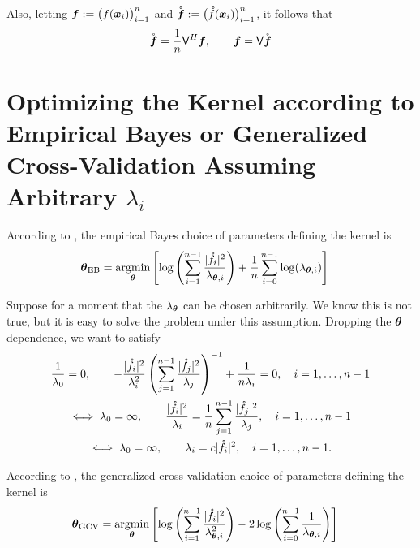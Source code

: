 \documentclass{amsart}
\newcommand{\rvf}{\mathring{\vf}}
\begin{document}
Also, letting $\boldsymbol{f} := \bigl( f(\boldsymbol{x}_i) \bigr)_{i=1}^n$ and $\rvf := \bigl( \rf(\vx_i) \bigr)_{i=1}^n$, it follows that
\begin{equation}
    \rvf = \frac 1n \mV^H \vf, \qquad \vf = \mV \rvf
\end{equation}



\section{Optimizing the Kernel according to Empirical Bayes or Generalized Cross-Validation Assuming Arbitrary $\lambda_i$}
According to \cite{RatHic19a}, the empirical Bayes choice of parameters defining the kernel is
\begin{align*}
    \boldsymbol{\theta}_{\text{EB}} 
    &= \operatorname*{argmin}_{\boldsymbol{\theta}} \left [\log\left( \sum_{i=1}^{n-1} \frac{\lvert\mathring{f}_i\rvert^2}{\lambda_{\boldsymbol{\theta},i}} \right)
    + \frac 1n \sum_{i=0}^{n-1} \log(\lambda_{\boldsymbol{\theta},i} ) \right ]
\end{align*}

Suppose for a moment that the $\lambda_{\boldsymbol{\theta}}$ can be chosen arbitrarily.   We know this is not true, but it is easy to solve the problem under this assumption.  Dropping the $\boldsymbol{\theta}$ dependence, we want to satisfy
\begin{gather*}
    \frac 1{\lambda_0} = 0, \qquad 
    - \frac{\lvert\mathring{f}_i\rvert^2}{\lambda_{i}^2} \left( \sum_{j=1}^{n-1} \frac{\lvert\mathring{f}_j\rvert^2}{\lambda_{j}} \right)^{-1} + \frac 1{n\lambda_i} = 0, \quad i = 1, \ldots, n-1
    \\
    \iff
    \lambda_0 = \infty, \qquad \frac{\lvert\mathring{f}_i\rvert^2}{\lambda_{i}} = \frac 1n \sum_{j=1}^{n-1} \frac{\lvert\mathring{f}_j\rvert^2}{\lambda_{j}}, \quad i = 1, \ldots, n-1
    \\
    \iff
    \lambda_0 = \infty, \qquad \lambda_i = c \lvert\mathring{f}_i\rvert^2, \quad i = 1, \ldots, n-1.
\end{gather*}

According to \cite{RatHic19a}, the generalized cross-validation choice of parameters defining the kernel is
\begin{align*}
    \boldsymbol{\theta}_{\text{GCV}} 
    &= \operatorname*{argmin}_{\boldsymbol{\theta}} \left [\log\left( \sum_{i=1}^{n-1} \frac{\lvert\mathring{f}_i\rvert^2}{\lambda_{\boldsymbol{\theta},i}^2} \right)
    - 2 \log \left(\sum_{i=0}^{n-1} \frac{1}{\lambda_{\boldsymbol{\theta},i}} \right) \right ]
\end{align*}
\end{document}
